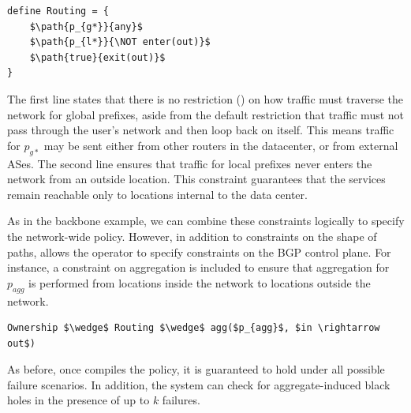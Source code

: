 \begin{lstlisting}[mathescape=true]
define Routing = {
    $\path{p_{g*}}{any}$
    $\path{p_{l*}}{\NOT enter(out)}$
    $\path{true}{exit(out)}$
}
\end{lstlisting}

The first line states that there is no restriction ()
on how traffic must
traverse the network for global prefixes, aside from the default restriction
that traffic must not pass through the user's network and then loop
back on itself. This means traffic for
$p_{g*}$ may be sent either from other routers in the datacenter, or
from external ASes. The second line ensures that traffic for local
prefixes never enters the network from an outside location. This constraint
guarantees that the services remain reachable only to locations
internal to the data center.

As in the backbone example, we can combine these constraints
logically to specify the network-wide policy.
However, in addition to constraints on the shape of paths,
\sysname allows the operator to specify constraints on the BGP control plane.
For instance, a constraint on aggregation is included to ensure that
aggregation for $p_{agg}$ is performed from locations inside the network
to locations outside the network. 

\begin{lstlisting}[mathescape=true]
Ownership $\wedge$ Routing $\wedge$ agg($p_{agg}$, $in \rightarrow out$)
\end{lstlisting}

As before, once \sysname compiles the policy, it is guaranteed to hold under
all possible failure scenarios. In addition, the system can check for
aggregate-induced black holes in the presence of up to $k$ failures.


